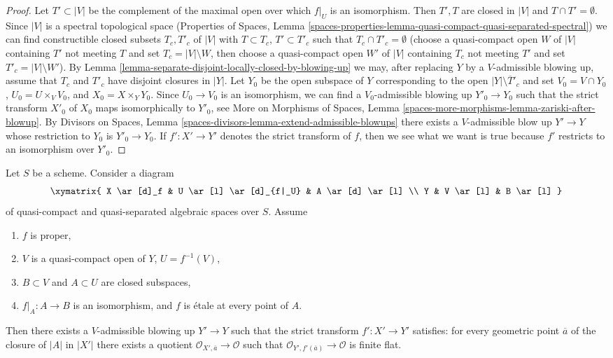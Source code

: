 \begin{proof}
Let $T' \subset |V|$ be the complement of the maximal open over which
$f|_U$ is an isomorphism. Then $T', T$ are closed in $|V|$ and
$T \cap T' = \emptyset$. Since $|V|$ is a spectral topological space
(Properties of Spaces, Lemma
\ref{spaces-properties-lemma-quasi-compact-quasi-separated-spectral})
we can find constructible closed subsets $T_c, T'_c$ of $|V|$
with $T \subset T_c$, $T' \subset T'_c$ such that
$T_c \cap T'_c = \emptyset$ (choose a quasi-compact
open $W$ of $|V|$ containing $T'$ not meeting $T$
and set $T_c = |V| \setminus W$, then choose a quasi-compact
open $W'$ of $|V|$ containing $T_c$ not meeting $T'$
and set $T'_c = |V| \setminus W'$).
By Lemma \ref{lemma-separate-disjoint-locally-closed-by-blowing-up}
we may, after replacing $Y$ by a $V$-admissible blowing up,
assume that $T_c$ and $T'_c$ have disjoint closures in $|Y|$.
Let $Y_0$ be the open subspace of $Y$ corresponding to the open
$|Y| \setminus \overline{T}'_c$ and set $V_0 = V \cap Y_0$,
$U_0 = U \times_V V_0$, and $X_0 = X \times_Y Y_0$.
Since $U_0 \to V_0$ is an isomorphism, we can find a
$V_0$-admissible blowing up $Y'_0 \to Y_0$ such that the
strict transform $X'_0$ of $X_0$ maps isomorphically to $Y'_0$, see
More on Morphisms of Spaces, Lemma
\ref{spaces-more-morphisms-lemma-zariski-after-blowup}.
By Divisors on Spaces, Lemma
\ref{spaces-divisors-lemma-extend-admissible-blowups}
there exists a $V$-admissible blow up $Y' \to Y$ whose restriction
to $Y_0$ is $Y'_0 \to Y_0$. If $f' : X' \to Y'$ denotes the
strict transform of $f$, then we see what we want is true because
$f'$ restricts to an isomorphism over $Y'_0$.
\end{proof}

\begin{lemma}
\label{lemma-blowup-etale-along}
Let $S$ be a scheme. Consider a diagram
$$
\xymatrix{
X \ar[d]_f & U \ar[l] \ar[d]_{f|_U} & A \ar[d] \ar[l] \\
Y & V \ar[l] & B \ar[l]
}
$$
of quasi-compact and quasi-separated algebraic spaces over $S$.
Assume
\begin{enumerate}
\item $f$ is proper,
\item $V$ is a quasi-compact open of $Y$, $U = f^{-1}(V)$,
\item $B \subset V$ and $A \subset U$ are closed subspaces,
\item $f|_A : A \to B$ is an isomorphism, and
$f$ is \'etale at every point of $A$.
\end{enumerate}
Then there exists a $V$-admissible blowing up $Y' \to Y$ such that the strict
transform $f' : X' \to Y'$ satisfies: for every geometric point
$\overline{a}$ of the closure of $|A|$ in $|X'|$
there exists a quotient $\mathcal{O}_{X', \overline{a}} \to \mathcal{O}$
such that $\mathcal{O}_{Y', f'(\overline{a})} \to \mathcal{O}$
is finite flat.
\end{lemma}


